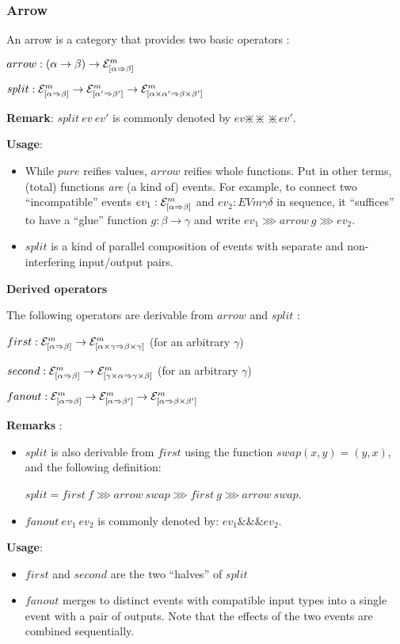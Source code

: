 \documentclass{article}
\newcommand{\EV}[3]{\ensuremath{{\cal{E}}^{#1}_{[#2 \Rightarrow #3]}}}
\newcommand{\SEQ}{\ggg} %
\newcommand{\SPLIT}{\mathbin{\divideontimes\!\!\!\!\divideontimes\!\!\!\!\divideontimes}}
\newcommand{\FANOUT}{\mathbin{\&\!\!\!\&\!\!\!\&}}
\begin{document}
\subsubsection{Arrow}

An arrow is a category that provides two basic operators :

$arrow : (\alpha \rightarrow \beta) \rightarrow \EV{m}{\alpha}{\beta}$

$split : \EV{m}{\alpha}{\beta} \rightarrow \EV{m}{\alpha'}{\beta'} \rightarrow \EV{m}{\alpha \times \alpha'}{\beta \times \beta'}$

\textbf{Remark}: $split~ev~ev'$ is commonly denoted by $ev \SPLIT ev'$.

\textbf{Usage}:
\begin{itemize}
\item While $pure$ reifies values, $arrow$ reifies whole functions. Put in other terms, (total) functions \emph{are} (a kind of) events. For example, to connect two ``incompatible'' events $ev_1 : \EV{m}{\alpha}{\beta}$ and $ev_2 : EV{m}{\gamma}{\delta}$ in sequence, it ``suffices'' to have a ``glue'' function $g : \beta \rightarrow \gamma$ and write $ev_1 \SEQ arrow~g \SEQ ev_2$.
\item $split$ is a kind of parallel composition of events with separate and non-interfering input/output pairs.
\end{itemize}

\textbf{Derived operators}

The following operators are derivable from $arrow$ and $split$ :

$first : \EV{m}{\alpha}{\beta} \rightarrow \EV{m}{\alpha \times \gamma}{\beta \times \gamma}$ (for an arbitrary $\gamma$)

$second : \EV{m}{\alpha}{\beta} \rightarrow \EV{m}{\gamma \times \alpha}{\gamma \times \beta}$ (for an arbitrary $\gamma$)

$fanout : \EV{m}{\alpha}{\beta} \rightarrow \EV{m}{\alpha}{\beta'} \rightarrow \EV{m}{\alpha}{\beta \times \beta'}$

\textbf{Remarks} : 
\begin{itemize}
\item $split$ is also derivable from $first$ using the function $swap (x, y) = (y, x)$, and the following definition: 

$split = first~f \SEQ arrow~swap \SEQ first~g \SEQ arrow~swap$.
\item $fanout~ev_1~ev_2$ is commonly denoted by: $ev_1 \FANOUT ev_2$.
\end{itemize}

\textbf{Usage}:
\begin{itemize}
\item $first$ and $second$ are the two ``halves'' of $split$ 
\item $fanout$ merges to distinct events with compatible input types into a single event with a pair of outputs. Note that the effects of the two events are combined sequentially.
\end{itemize}
\end{document}
